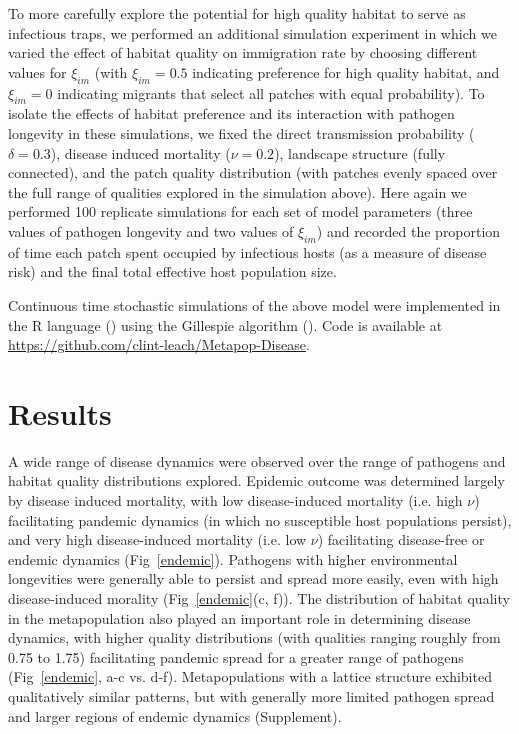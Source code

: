 \documentclass{article}
\begin{document}
To more carefully explore the potential for high quality habitat to serve as infectious traps, we performed an additional simulation experiment in which we varied the effect of habitat quality on immigration rate by choosing different values for $\xi_{im}$ (with $\xi_{im} = 0.5$ indicating preference for high quality habitat, and  $\xi_{im} = 0$ indicating migrants that select all patches with equal probability).  To isolate the effects of habitat preference and its interaction with pathogen longevity in these simulations, we fixed the direct transmission probability ($\delta = 0.3$), disease induced mortality ($\nu = 0.2$), landscape structure (fully connected), and the patch quality distribution (with patches evenly spaced over the full range of qualities explored in the simulation above).  Here again we performed 100 replicate simulations for each set of model parameters (three values of pathogen longevity and two values of $\xi_{im}$) and recorded the proportion of time each patch spent occupied by infectious hosts (as a measure of disease risk) and the final total effective host population size.

Continuous time stochastic simulations of the above model were implemented in the R language (\cite{R2014}) using the Gillespie algorithm (\cite{Gillespie1977}).  Code is available at \url{https://github.com/clint-leach/Metapop-Disease}.

\section{Results}
\label{results}

A wide range of disease dynamics were observed over the range of pathogens and habitat quality distributions explored.  
Epidemic outcome was determined largely by disease induced mortality, with low disease-induced mortality (i.e. high $\nu$) facilitating pandemic dynamics (in which no susceptible host populations persist), and very high disease-induced mortality (i.e. low $\nu$) facilitating disease-free or endemic dynamics (Fig~\ref{endemic}). 
Pathogens with higher environmental longevities were generally able to persist and spread more easily, even with high disease-induced morality (Fig~\ref{endemic}(c, f)).  
The distribution of habitat quality in the metapopulation also played an important role in determining disease dynamics, with higher quality distributions (with qualities ranging roughly from 0.75 to 1.75) facilitating pandemic spread for a greater range of pathogens (Fig~\ref{endemic}, a-c vs. d-f).
Metapopulations with a lattice structure exhibited qualitatively similar patterns, but with generally more limited pathogen spread and larger regions of endemic dynamics (Supplement).
\end{document}
